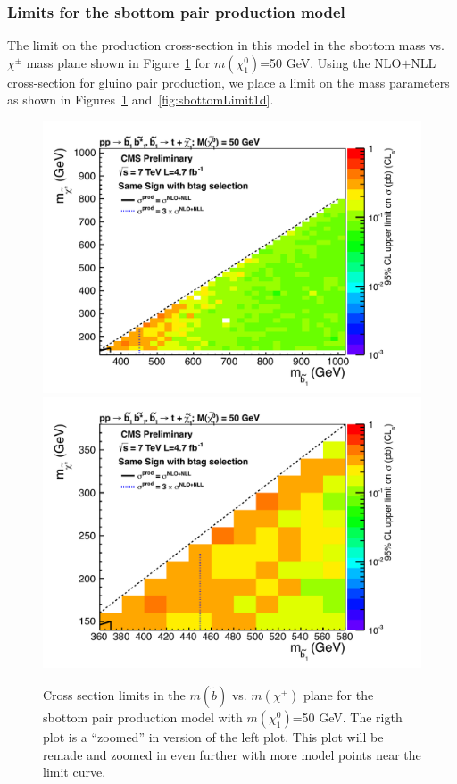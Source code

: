 \subsubsection{Limits for the sbottom pair production model}
\label{sec:sbottompairlimits}
The limit on the production cross-section in this model in the 
sbottom mass vs. $\chi^{\pm}$ mass plane shown in 
Figure~\ref{fig:sbottomLimit} for 
$m(\chi^0_1)$=50 GeV. 
Using the 
NLO$+$NLL cross-section for gluino pair production, we place a limit
on the mass parameters as shown in Figures~\ref{fig:sbottomLimit}
and~\ref{fig:sbottomLimit1d}.

\begin{figure}[htb]
\begin{center}
\includegraphics[width=0.48\linewidth]{figs/sbottom_limit.pdf}
\includegraphics[width=0.48\linewidth]{figs/sbottom_limit_zoom.pdf}
\caption{Cross section limits in the $m(\widetilde{b})$ vs. $m(\chi^{\pm})$ 
plane for the sbottom pair production model with 
$m(\chi^0_1)$=50 GeV.  The rigth plot is a ``zoomed'' in version 
of the left plot.  This plot will be remade and zoomed in even 
further with more model points near the limit curve.\label{fig:sbottomLimit}}
\end{center}
\end{figure}


